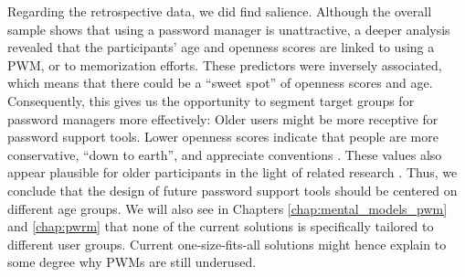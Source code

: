 Regarding the retrospective data, we did find salience. Although the overall sample shows that using a password manager is unattractive, a deeper analysis revealed that the participants' age and openness scores are linked to using a \gls{PWM}, or to memorization efforts. These predictors were inversely associated, which means that there could be a ``sweet spot'' of openness scores and age. Consequently, this gives us the opportunity to segment target groups for password managers more effectively: Older users might be more receptive for password support tools. Lower openness scores indicate that people are more conservative, ``down to earth'', and appreciate conventions \cite{McCrae1987ValidationFFM}. These values also appear plausible for older participants in the light of related research \cite{Srivastava2003PersonalityAdulthood}. Thus, we conclude that the design of future password support tools should be centered on different age groups. We will also see in Chapters \ref{chap:mental_models_pwm} and \ref{chap:pwrm} that none of the current solutions is specifically tailored to different user groups. Current one-size-fits-all solutions might hence explain to some degree why \glspl{PWM} are still underused.


